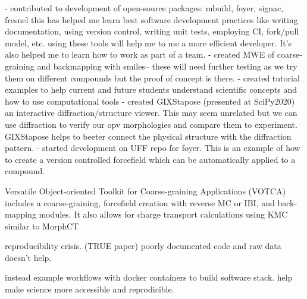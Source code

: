 - contributed to development of open-source packages: mbuild, foyer, signac, fresnel
 this has helped me learn best software development practices like writing documentation, using version control, writing unit tests, employing CI, fork/pull model, etc.
using these tools will help me to me a more efficient developer.
It's also helped me to learn how to work as part of a team.
 - created MWE of coarse-graining and backmapping with smiles-- these will need further testing as we try them on different compounds but the proof of concept is there.
 - created tutorial examples to help current and future students understand scientific concepts and how to use computational tools
 - created GIXStapose (presented at SciPy2020) an interactive diffraction/structure viewer.
This may seem unrelated but we can use diffraction to verify our opv morphologies and compare them to experiment.
GIXStapose helps to beeter connect the physical structure with the diffraction pattern.
- started development on UFF repo for foyer.
This is an example of how to create a version controlled forcefield which can be automatically applied to a compound.

Versatile Object-oriented Toolkit for Coarse-graining Applications (VOTCA) \cite{Ruhle2011b}
includes a coarse-graining, forcefield creation with reverse MC or IBI, and back-mapping modules.
It also allows for charge transport calculations using KMC similar to MorphCT \cite{Lukyanov2010}

reproducibility crisis.\cite{Cummings2019} \cite{Thompson2020} (TRUE paper) poorly documented code and raw data doesn't help.

instead example workflows with docker containers to build software stack.
help make science more accessible and reprodicible.

